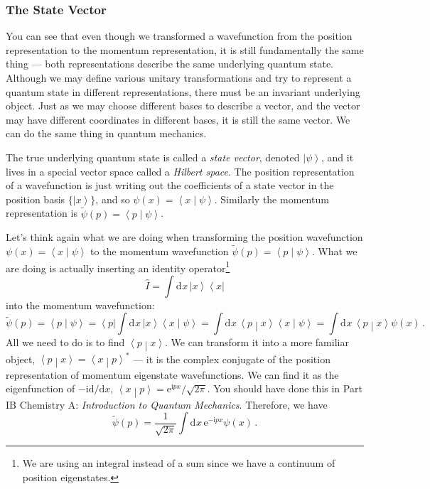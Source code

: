 \documentclass{article}
\theoremstyle{plain}\theoremheaderfont{\normalfont\itshape}\theorembodyfont{\rmfamily}\theoremseparator{.}\newtheorem*{rem}{Remark}\newtheorem*{ex}{Example}\newtheorem*{proof}{Proof}\newtheorem*{altp}{Alternative proof}
\theoremstyle{plain}\theoremheaderfont{\normalfont\bfseries}\theorembodyfont{\rmfamily}\theoremseparator{.}\newtheorem{thm}{Theorem}[section]\newtheorem{lem}[thm]{Lemma}\newtheorem{prop}[thm]{Proposition}\newtheorem*{cor}{Corollary}\newtheorem{defn}[thm]{Definition}\newtheorem{clm}[thm]{Claim}\newtheorem{clminproof}{Claim}
\theoremstyle{break}\theoremheaderfont{\normalfont\itshape}\theorembodyfont{\rmfamily}\theoremseparator{.\medskip}\newtheorem*{proofskip}{Proof}\newtheorem*{exs}{Examples}\newtheorem*{rems}{Remarks}
\theoremstyle{break}\theoremheaderfont{\normalfont\bfseries}\theorembodyfont{\rmfamily}\theoremseparator{.\medskip}\newtheorem{lemskip}[thm]{Lemma}\newtheorem{defnskip}[thm]{Definition}\newtheorem{propskip}[thm]{Proposition}\newtheorem{thmskip}[thm]{Theorem}
\numberwithin{equation}{section}
\newcommand{\ii}{\mathrm{i}}
\newcommand{\ee}{\mathrm{e}}
\newcommand{\dd}[2][]{\mathrm{d}^{#1} #2\,}
\newcommand{\bra}[1]{\left\langle #1 \right|}
\newcommand{\ket}[1]{\left| #1 \right\rangle}
\newcommand{\braket}[2]{\left\langle #1 \middle| #2 \right\rangle}
\begin{document}
    \subsubsection{The State Vector}
    You can see that even though we transformed a wavefunction from the position representation to the momentum representation, it is still fundamentally the same thing --- both representations describe the same underlying quantum state. Although we may define various unitary transformations and try to represent a quantum state in different representations, there must be an invariant underlying object. Just as we may choose different bases to describe a vector, and the vector may have different coordinates in different bases, it is still the same vector. We can do the same thing in quantum mechanics.

    The true underlying quantum state is called a \textit{state vector}, denoted \(\ket{\psi}\), and it lives in a special vector space called a \textit{Hilbert space}. The position representation of a wavefunction is just writing out the coefficients of a state vector in the position basis \(\{\ket{x}\}\), and so \(\psi(x)=\braket{x}{\psi}\). Similarly the momentum representation is \(\tilde{\psi}(p)=\braket{p}{\psi}\).

    Let's think again what we are doing when transforming the position wavefunction \(\psi(x)=\braket{x}{\psi}\) to the momentum wavefunction \(\tilde{\psi}(p)=\braket{p}{\psi}\). What we are doing is actually inserting an identity operator\footnote{We are using an integral instead of a sum since we have a continuum of position eigenstates.}
    \begin{equation}
        \hat{I}=\int\dd{x}\ket{x}\bra{x}
    \end{equation}
    into the momentum wavefunction:
    \begin{equation}
        \tilde{\psi}(p)=\braket{p}{\psi}=\bra{p}\int\dd{x}\ket{x}\braket{x}{\psi}=\int\dd{x}\braket{p}{x}\braket{x}{\psi}=\int\dd{x}\braket{p}{x}\psi(x)\,.
    \end{equation}
    All we need to do is to find \(\braket{p}{x}\). We can transform it into a more familiar object, \(\braket{p}{x}=\braket{x}{p}^*\) --- it is the complex conjugate of the position representation of momentum eigenstate wavefunctions. We can find it as the eigenfunction of \(-\ii\mathrm{d}/\mathrm{d}x\), \(\braket{x}{p}=\ee^{\ii px}/\sqrt{2\pi}\). You should have done this in Part IB Chemistry A: \textit{Introduction to Quantum Mechanics}. Therefore, we have
    \begin{equation}
        \tilde{\psi}(p)=\frac{1}{\sqrt{2\pi}}\int\dd{x}\ee^{-\ii px}\psi(x)\,.
    \end{equation}
    
\end{document}

